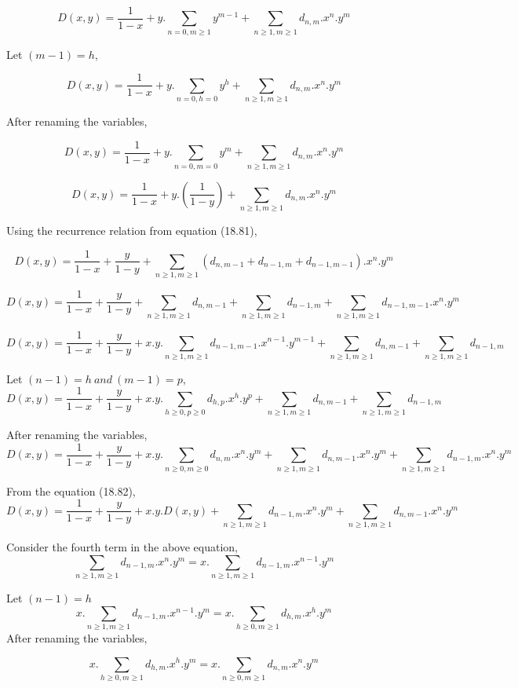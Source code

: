 $$D(x,y) = \frac{1}{1-x} + y.\sum_{n=0,m \geq 1}y^{m-1} + \sum_{n \geq 1,m \geq 1}d_{n,m}.x^n.y^m$$


Let $(m-1)=h$,

$$D(x,y) = \frac{1}{1-x} + y.\sum_{n=0,h=0}y^h + \sum_{n \geq 1,m \geq 1}d_{n,m}.x^n.y^m$$

After renaming the variables,

$$D(x,y) = \frac{1}{1-x} + y.\sum_{n=0,m=0}y^m + \sum_{n \geq 1,m \geq 1}d_{n,m}.x^n.y^m$$

$$D(x,y) = \frac{1}{1-x} + y.\left(\frac{1}{1-y}\right) + \sum_{n \geq 1,m \geq 1}d_{n,m}.x^n.y^m$$

Using the recurrence relation from equation (18.81),

$$D(x,y) = \frac{1}{1-x} + \frac{y}{1-y} + \sum_{n \geq 1,m \geq 1}(d_{n,m-1} + d_{n-1,m} + d_{n-1,m-1}).x^n.y^m$$

$$D(x,y) = \frac{1}{1-x} + \frac{y}{1-y} + \sum_{n \geq 1,m \geq 1}d_{n,m-1} + \sum_{n \geq 1,m \geq 1}d_{n-1,m} + \sum_{n \geq 1,m \geq 1}d_{n-1,m-1}.x^n.y^m$$

$$D(x,y) = \frac{1}{1-x} + \frac{y}{1-y} + x.y.\sum_{n \geq 1,m \geq 1}d_{n-1,m-1}.x^{n-1}.y^{m-1} + \sum_{n \geq 1,m \geq 1}d_{n,m-1} + \sum_{n \geq 1,m \geq 1}d_{n-1,m}$$

Let $(n-1)=h~and~(m-1)=p$,
$$D(x,y) = \frac{1}{1-x} + \frac{y}{1-y} + x.y.\sum_{h \geq 0,p \geq 0}d_{h,p}.x^{h}.y^{p} + \sum_{n \geq 1,m \geq 1}d_{n,m-1} + \sum_{n \geq 1,m \geq 1}d_{n-1,m}$$

After renaming the variables,
$$D(x,y) = \frac{1}{1-x} + \frac{y}{1-y} + x.y.\sum_{n \geq 0,m \geq 0}d_{n,m}.x^{n}.y^{m} + \sum_{n \geq 1,m \geq 1}d_{n,m-1}.x^{n}.y^{m} + \sum_{n \geq 1,m \geq 1}d_{n-1,m}.x^{n}.y^{m}$$

From the equation (18.82),
\begin{equation}
D(x,y) = \frac{1}{1-x} + \frac{y}{1-y} + x.y.D(x,y) + \sum_{n \geq 1,m \geq 1}d_{n-1,m}.x^{n}.y^{m} +\sum_{n \geq 1,m \geq 1}d_{n,m-1}.x^{n}.y^{m}
\end{equation}

Consider the fourth term in the above equation,
$$\sum_{n \geq 1,m \geq 1}d_{n-1,m}.x^{n}.y^{m} = x.\sum_{n \geq 1,m \geq 1}d_{n-1,m}.x^{n-1}.y^{m}$$

Let $(n-1)=h$
$$x.\sum_{n \geq 1,m \geq 1}d_{n-1,m}.x^{n-1}.y^{m} = x.\sum_{h \geq 0,m \geq 1}d_{h,m}.x^h.y^m$$
After renaming the variables,

$$x.\sum_{h \geq 0,m \geq 1}d_{h,m}.x^h.y^m = x.\sum_{n \geq 0,m \geq 1}d_{n,m}.x^n.y^m$$

